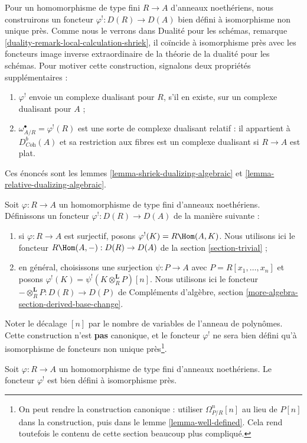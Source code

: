 \noindent
Pour un homomorphisme de type fini $R \to A$ d'anneaux noethériens,
nous construirons un foncteur $\varphi^! : D(R) \to D(A)$ bien défini à isomorphisme non unique près.
Comme nous le verrons dans Dualité pour les schémas, remarque \ref{duality-remark-local-calculation-shriek},
il coïncide à isomorphisme près avec les foncteurs image inverse
extraordinaire de la théorie de la dualité pour les schémas.
Pour motiver cette construction, signalons deux propriétés supplémentaires :
\begin{enumerate}
\item $\varphi^!$ envoie un complexe dualisant pour $R$, s'il en existe,
sur un complexe dualisant pour $A$ ;
\item $\omega_{A/R}^\bullet = \varphi^!(R)$ est une sorte de complexe dualisant relatif :
il appartient à $D^b_{\textit{Coh}}(A)$ et sa restriction aux fibres est un complexe
dualisant si $R \to A$ est plat.
\end{enumerate}
Ces énoncés sont les lemmes \ref{lemma-shriek-dualizing-algebraic} et \ref{lemma-relative-dualizing-algebraic}.

\medskip\noindent
Soit $\varphi : R \to A$ un homomorphisme de type fini d'anneaux noethériens.
Définissons un foncteur $\varphi^! : D(R) \to D(A)$ de la manière suivante :
\begin{enumerate}
\item si $\varphi : R \to A$ est surjectif, posons $\varphi^!(K) = R\Hom(A, K)$.
Nous utilisons ici le foncteur $R\Hom(A, -) : D(R) \to D(A)$ de la section \ref{section-trivial} ;
\item en général, choisissons une surjection $\psi : P \to A$ avec $P = R[x_1, \ldots, x_n]$
et posons $\varphi^!(K) = \psi^!(K \otimes_R^\mathbf{L} P)[n]$.
Nous utilisons ici le foncteur $- \otimes_R^\mathbf{L} P : D(R) \to D(P)$
de Compléments d'algèbre, section \ref{more-algebra-section-derived-base-change}.
\end{enumerate}
Noter le décalage $[n]$ par le nombre de variables de l'anneau de polynômes.
Cette construction n'est {\bf pas} canonique,
et le foncteur $\varphi^!$ ne sera bien défini qu'à isomorphisme
de foncteurs non unique près\footnote{On peut rendre la construction canonique :
utiliser $\Omega^n_{P/R}[n]$ au lieu de $P[n]$ dans la construction,
puis dans le lemme \ref{lemma-well-defined}.
Cela rend toutefois le contenu de cette section beaucoup plus compliqué.}.

\begin{lemma}
\label{lemma-well-defined}
Soit $\varphi : R \to A$ un homomorphisme de type fini d'anneaux noethériens.
Le foncteur $\varphi^!$ est bien défini à isomorphisme près.
\end{lemma}

